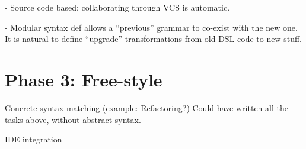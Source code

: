 \documentclass[a4paper]{article}
\begin{document}
- Source code based: collaborating through VCS is automatic.

- Modular syntax def allows a ``previous'' grammar to co-exist with
the new one. It is natural to define ``upgrade'' transformations from
old DSL code to new stuff.


\section*{Phase 3: Free-style}

Concrete syntax matching (example: Refactoring?) Could have written
all the tasks above, without abstract syntax.

IDE integration
\end{document}
